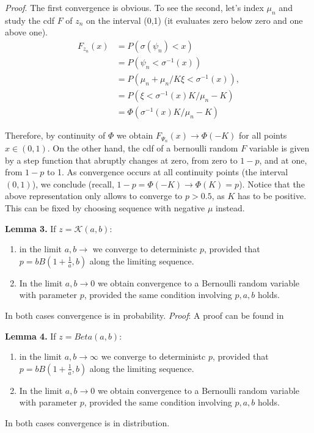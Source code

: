 \documentclass{article}
\begin{document}
\textit{Proof}. The first convergence is obvious. To see the second, let's index $\mu_n$ and  study the cdf $F$ of $z_n$ on the interval (0,1) (it evaluates zero below zero and one above one).
\begin{align}F_{z_n}(x)&= P(\sigma(\psi_n)<x) \\
&=P(\psi_n< \sigma^{-1}(x))\\
&=P(\mu_n +\mu_n/K\xi <\sigma^{-1}(x)),\\\
&= P( \xi <\sigma^{-1}(x)K/\mu_n - K)\\
&= \Phi( \sigma^{-1}(x)K/\mu_n - K) 
\end{align}

Therefore, by continuity of $\Phi$ we obtain $F_{\Psi_n}(x)\rightarrow \Phi(-K)$ for all points $x\in(0,1)$. On the other hand, the cdf of a bernoulli random $F$ variable is given by  a step function that abruptly changes at zero, from zero to $1-p$, and at one, from $1-p$ to 1. As convergence occurs at all continuity points (the interval $(0,1)$), we conclude (recall, $1-p= \Phi(-K)\rightarrow \Phi(K)=p$). Notice that the above representation only allows  to converge to $p>0.5$, as $K$ has to be positive. This can be fixed by choosing sequence with negative $\mu$ instead.

\textbf{Lemma 3.} If $z=\mathcal{K}(a,b)$: \begin{enumerate}
\item in the limit $a,b \rightarrow $  we converge to deterministc $p$, provided that $p=bB\left(1+\frac{1}{a},b\right)$ along the limiting sequence.
\item In the limit $a,b\rightarrow 0$ we obtain convergence to a Bernoulli random variable with parameter $p$, provided the same condition involving $p,a,b$ holds. 
\end{enumerate}
In both cases convergence is in probability.
\textit{Proof}: A proof can be found in \cite{mitnik2013kumar}

\textbf{Lemma 4.} If $z=Beta(a,b)$: \begin{enumerate}
\item in the limit $a,b \rightarrow \infty $  we converge to deterministc $p$, provided that $p=bB\left(1+\frac{1}{a},b\right)$ along the limiting sequence.
\item In the limit $a,b\rightarrow 0$ we obtain convergence to a Bernoulli random variable with parameter $p$, provided the same condition involving $p,a,b$ holds. 
\end{enumerate}
In both cases convergence is in distribution.
\end{document}
